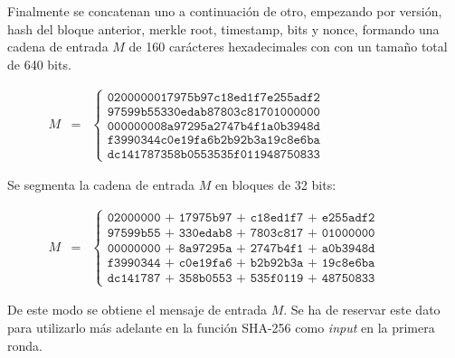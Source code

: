 \documentclass{article}
\begin{document}
    Finalmente se concatenan uno a continuación de otro, empezando por versión, hash del bloque anterior, merkle root, timestamp, bits y nonce, formando una cadena de entrada $M$ de 160 carácteres hexadecimales con con un tamaño total de 640 bits.
    
    \begin{figure}[H]
    \centering
        $\begin{array}{rcl}
             M & = & \left \{
            \begin{array}{c}
                \texttt{0200000017975b97c18ed1f7e255adf2} \\
                \texttt{97599b55330edab87803c81701000000} \\
                \texttt{000000008a97295a2747b4f1a0b3948d} \\
                \texttt{f3990344c0e19fa6b2b92b3a19c8e6ba} \\
                \texttt{dc141787358b0553535f011948750833}
            \end{array}
            \right .
        \end{array}$
    \end{figure}
    
    Se segmenta la cadena de entrada $M$ en bloques de 32 bits:
    \begin{figure}[H]
    \centering
        $\begin{array}{rcl}
             M & = & \left \{
            \begin{array}{c}
                \texttt{02000000 + 17975b97 + c18ed1f7 + e255adf2} \\
                \texttt{97599b55 + 330edab8 + 7803c817 + 01000000} \\
                \texttt{00000000 + 8a97295a + 2747b4f1 + a0b3948d} \\
                \texttt{f3990344 + c0e19fa6 + b2b92b3a + 19c8e6ba} \\
                \texttt{dc141787 + 358b0553 + 535f0119 + 48750833}
            \end{array}
            \right .
        \end{array}$
    \end{figure}
    
    De este modo se obtiene el mensaje de entrada $M$. Se ha de reservar este dato para utilizarlo más adelante en la función SHA-256 como \textit{input} en la primera ronda.
    
\end{document}
